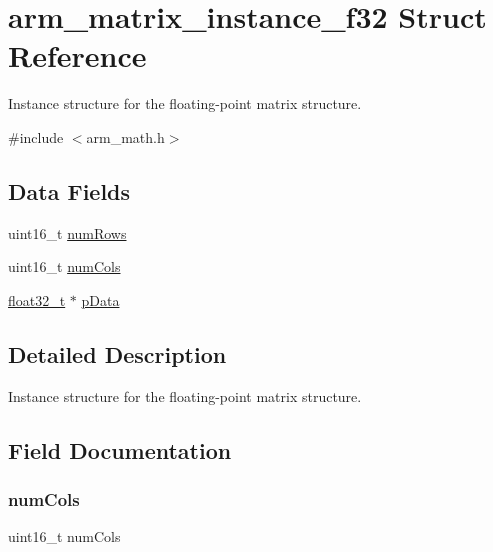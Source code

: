\hypertarget{structarm__matrix__instance__f32}{}\section{arm\+\_\+matrix\+\_\+instance\+\_\+f32 Struct Reference}
\label{structarm__matrix__instance__f32}


Instance structure for the floating-\/point matrix structure.  




{\ttfamily \#include $<$arm\+\_\+math.\+h$>$}

\subsection*{Data Fields}
\begin{DoxyCompactItemize}
\item 
uint16\+\_\+t \mbox{\hyperlink{structarm__matrix__instance__f32_a1bcf80ccdc2acc29198f1592ae300390}{num\+Rows}}
\item 
uint16\+\_\+t \mbox{\hyperlink{structarm__matrix__instance__f32_a4bb5ec0d13eb4c9cf887aa8366a44117}{num\+Cols}}
\item 
\mbox{\hyperlink{arm__math_8h_a4611b605e45ab401f02cab15c5e38715}{float32\+\_\+t}} $\ast$ \mbox{\hyperlink{structarm__matrix__instance__f32_af5c3a2f15c98850cdcfbe6f87e5ac5df}{p\+Data}}
\end{DoxyCompactItemize}


\subsection{Detailed Description}
Instance structure for the floating-\/point matrix structure. 

\subsection{Field Documentation}
\mbox{\label{structarm__matrix__instance__f32_a4bb5ec0d13eb4c9cf887aa8366a44117}} 
\subsubsection{\texorpdfstring{numCols}{numCols}}
{\footnotesize\ttfamily uint16\+\_\+t num\+Cols}

